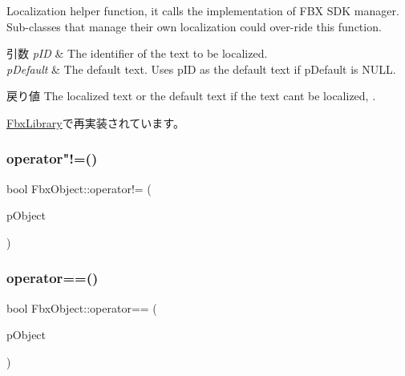 Localization helper function, it calls the implementation of F\+BX S\+DK manager. Sub-\/classes that manage their own localization could over-\/ride this function. 
\begin{DoxyParams}{引数}
{\em p\+ID} & The identifier of the text to be localized. \\
\hline
{\em p\+Default} & The default text. Uses p\+ID as the default text if p\+Default is N\+U\+LL. \\
\hline
\end{DoxyParams}
\begin{DoxyReturn}{戻り値}
The localized text or the default text if the text can\textquotesingle{}t be localized, . 
\end{DoxyReturn}


\hyperlink{class_fbx_library_a6f71bf208f95cc8033123e173e64b298}{Fbx\+Library}で再実装されています。

\mbox{\label{class_fbx_object_a9bdaa7d7553dc65fde0138f0e60be723}} 
\subsubsection{\texorpdfstring{operator"!=()}{operator!=()}}
{\footnotesize\ttfamily bool Fbx\+Object\+::operator!= (\begin{DoxyParamCaption}\item[{const \hyperlink{class_fbx_object}{Fbx\+Object} \&}]{p\+Object }\end{DoxyParamCaption})}

\mbox{\label{class_fbx_object_affe87473b7a6485c7c7ad6e4184a0cad}} 
\subsubsection{\texorpdfstring{operator==()}{operator==()}}
{\footnotesize\ttfamily bool Fbx\+Object\+::operator== (\begin{DoxyParamCaption}\item[{const \hyperlink{class_fbx_object}{Fbx\+Object} \&}]{p\+Object }\end{DoxyParamCaption})}

\mbox{\label{class_fbx_object_a68b9ad65d98d7be9cb252949bc709385}} 
